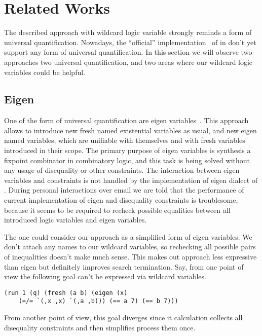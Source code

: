 

\section{Related Works}
\label{sec:related}

The described approach with wildcard logic variable
strongly reminds a form of universal quantification.
Nowadays, the ``official'' implementation~\cite{fasterMK} of \miniKanren{} in \Scheme{} don't yet support any form of universal quantification. In this section we will observe two approaches two universal quantification, and two areas where our wildcard logic variables could be helpful.

\subsection{Eigen}

One of the form of universal quantification are eigen variables~\cite{eigen}. This approach allows to introduce new fresh named existential variables as usual, and new eigen named variables, which are unifiable with themselves and with fresh variables introduced in their scope. The primary purpose of eigen variables is synthesis a fixpoint combinator in combinatory logic, and this task is being solved without any usage of disequality or other constraints. The interaction between eigen variables and constraints is not handled by the implementation of eigen dialect of \miniKanren{}. During personal interactions over email we are told that the performance of current implementation of eigen and disequality constraints is troublesome, because it seems to be required to recheck possible equalities between all introduced logic variables and eigen variables.

The one could consider our approach as a simplified form of eigen variables.
We don't attach any names to our wildcard variables, so rechecking all possible pairs of inequalities doesn't make much sense.
This makes out approach less expressive than eigen but definitely improves search termination.
Say, from one point of view the following goal can't be expressed via wildcard variables.
\begin{lstlisting}[language=ocanren]
(run 1 (q) (fresh (a b) (eigen (x)
    (=/= `(,x ,x) `(,a ,b))) (== a 7) (== b 7)))
\end{lstlisting}
From another point of view, this goal diverges since it calculation collects all disequality constraints and then simplifies process them once.

